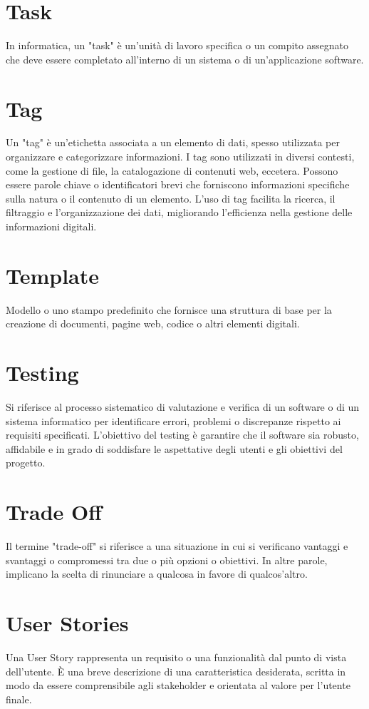 \documentclass{article}
\begin{document}
\section{Task}
In informatica, un "task" è un'unità di lavoro specifica o un compito assegnato che deve essere completato all'interno di un sistema o di un'applicazione software.

\section{Tag}
Un "tag" è un'etichetta associata a un elemento di dati, spesso utilizzata per organizzare e categorizzare informazioni. I tag sono utilizzati in diversi contesti, come la gestione di file, la catalogazione di contenuti web, eccetera. Possono essere parole chiave o identificatori brevi che forniscono informazioni specifiche sulla natura o il contenuto di un elemento. L'uso di tag facilita la ricerca, il filtraggio e l'organizzazione dei dati, migliorando l'efficienza nella gestione delle informazioni digitali.

\section{Template}
Modello o uno stampo predefinito che fornisce una struttura di base per la creazione di documenti, pagine web, codice o altri elementi digitali.

\section{Testing}
Si riferisce al processo sistematico di valutazione e verifica di un software o di un sistema informatico per identificare errori, problemi o discrepanze rispetto ai requisiti specificati. L'obiettivo del testing è garantire che il software sia robusto, affidabile e in grado di soddisfare le aspettative degli utenti e gli obiettivi del progetto.

\section{Trade Off}
Il termine "trade-off" si riferisce a una situazione in cui si verificano vantaggi e svantaggi o compromessi tra due o più opzioni o obiettivi. In altre parole, implicano la scelta di rinunciare a qualcosa in favore di qualcos'altro.

\section{User Stories}
Una User Story rappresenta un requisito o una funzionalità dal punto di vista dell'utente. È una breve descrizione di una caratteristica desiderata, scritta in modo da essere comprensibile agli stakeholder e orientata al valore per l'utente finale.
\end{document}

